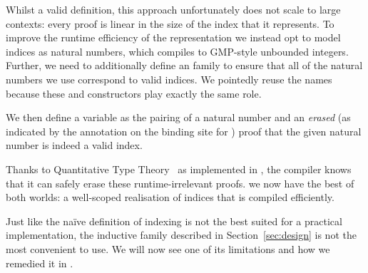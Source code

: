 Whilst a valid definition, this approach unfortunately does not scale to
large contexts:
%
every  proof is linear in the size of the \DeBruijn{}
index that it represents.
%
To improve the runtime efficiency of the representation we instead opt to
model \DeBruijn{} indices as natural numbers, which \Idris{} compiles to
GMP-style unbounded integers.
%
Further, we need to additionally define an  family to ensure that
all of the natural numbers we use correspond to valid indices.
%
We pointedly reuse the  names because these 
and  constructors play exactly the same role.


\noindent
We then define a variable as the pairing of a natural number and an \emph{erased}
(as indicated by the  annotation on the binding site for )
proof that the given natural number is indeed a valid \DeBruijn{} index.


Thanks to Quantitative Type Theory~\cite{DBLP:conf/birthday/McBride16,DBLP:conf/lics/Atkey18}
as implemented in \Idris{}, the compiler knows that it can safely erase these
runtime-irrelevant proofs.
%
we now have the best of both worlds: a well-scoped realisation of \DeBruijn{} indices
that is compiled efficiently.


Just like the naïve definition of \DeBruijn{} indexing is not the
best suited for a practical implementation,
the inductive family  described in Section~\ref{sec:design}
is not the most convenient to use.
%
We will now see one of its limitations and how we remedied it in
\Velo{}.

